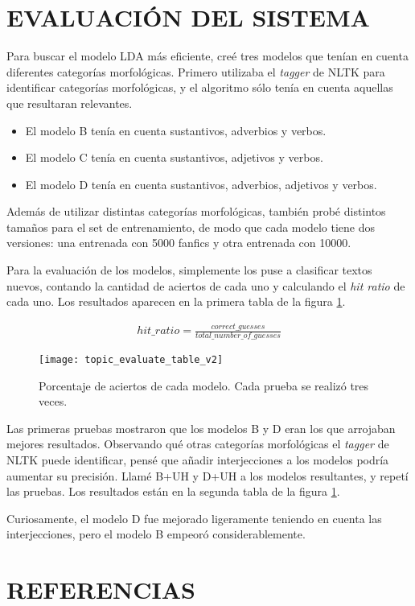 \documentclass{pre-tfg}
\begin{document}
\section{EVALUACIÓN DEL SISTEMA}


Para buscar el modelo LDA más eficiente, creé tres modelos que tenían en cuenta diferentes categorías morfológicas. Primero utilizaba el \textit{tagger} de NLTK para identificar categorías morfológicas, y el algoritmo sólo tenía en cuenta aquellas que resultaran relevantes.

\begin{itemize}
	\item El modelo B tenía en cuenta sustantivos, adverbios y verbos.
	\item El modelo C tenía en cuenta sustantivos, adjetivos y verbos.
	\item El modelo D tenía en cuenta sustantivos, adverbios, adjetivos y verbos.
\end{itemize}

Además de utilizar distintas categorías morfológicas, también probé distintos tamaños para el set de entrenamiento, de modo que cada modelo tiene dos versiones: una entrenada con 5000 fanfics y otra entrenada con 10000.

Para la evaluación de los modelos, simplemente los puse a clasificar textos nuevos, contando la cantidad de aciertos de cada uno y calculando el \textit{hit ratio} de cada uno. Los resultados aparecen en la primera tabla de la figura \ref{table:topic_evaluation}.

\begin{gather*}
hit\_ratio = \frac{correct\_guesses}{total\_number\_of\_guesses}
\end{gather*}

\begin{figure}
	\caption{Porcentaje de aciertos de cada modelo. Cada prueba se realizó tres veces.}
	\label{table:topic_evaluation}
	\texttt{[image: topic\_evaluate\_table\_v2]}
	\centering
\end{figure}

Las primeras pruebas mostraron que los modelos B y D eran los que arrojaban mejores resultados. Observando qué otras categorías morfológicas el \textit{tagger} de NLTK puede identificar, pensé que añadir interjecciones a los modelos podría aumentar su precisión. Llamé B+UH y D+UH a los modelos resultantes, y repetí las pruebas. Los resultados están en la segunda tabla de la figura \ref{table:topic_evaluation}.

Curiosamente, el modelo D fue mejorado ligeramente teniendo en cuenta las interjecciones, pero el modelo B empeoró considerablemente.

\section{REFERENCIAS}





\singlespacing
%

\end{document}
